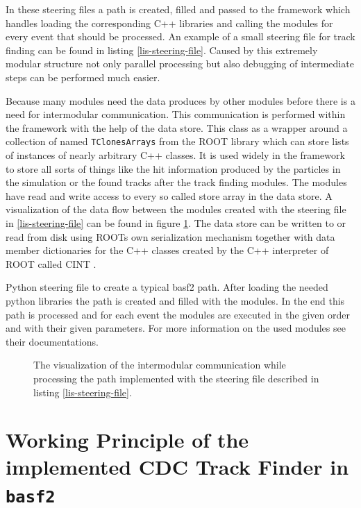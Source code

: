 In these steering files a path is created, filled and passed to the framework which handles loading the corresponding C++ libraries and calling the modules for every event that should be processed. An example of a small steering file for track finding can be found in listing \ref{lis-steering-file}. Caused by this extremely modular structure not only parallel processing but also debugging of intermediate steps can be performed much easier.

Because many modules need the data produces by other modules before there is a need for intermodular communication. This communication is performed within the framework with the help of the data store. This class as a wrapper around a collection of named \texttt{TClonesArrays} from the ROOT library \cite{tclonesarray} which can store lists of instances of nearly arbitrary C++ classes. It is used widely in the framework to store all sorts of things like the hit information produced by the particles in the simulation or the found tracks after the track finding modules. The modules have read and write access to every so called store array in the data store. A visualization of the data flow between the modules created with the steering file in \ref{lis-steering-file} can be found in figure \ref{fig-viz-datastore}. The data store can be written to or read from disk using ROOTs own serialization mechanism together with data member dictionaries for the C++ classes created by the C++ interpreter of ROOT called CINT \cite{cint}.

\begin{listing}
 \caption{Python steering file to create a typical basf2 path. After loading the needed python libraries the path is created and filled with the modules. In the end this path is processed and for each event the modules are executed in the given order and with their given parameters. For more information on the used modules see their documentations.}
 \label{lis-steering-file}
\end{listing}


\begin{figure}
 \caption{The visualization of the intermodular communication while processing the path implemented with the steering file described in listing \ref{lis-steering-file}.}
 \label{fig-viz-datastore}
\end{figure}


\section{Working Principle of the implemented CDC Track Finder in \texttt{basf2}}

